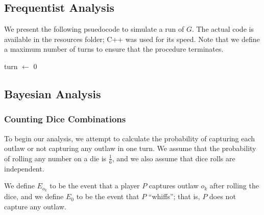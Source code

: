 \documentclass{article}
\theoremstyle{definition}
\theoremstyle{plain}
\begin{document}
	\subsection{Frequentist Analysis}
	We present the following psuedocode to simulate a run of $G$. The actual code is available in the resources folder; C++ was used for its speed. Note that we define a maximum number of turns to ensure that the procedure terminates.
	\begin{algorithm}

	turn $\gets$ 0\\
	\end{algorithm}

	\subsection{Bayesian Analysis}

	\subsubsection{Counting Dice Combinations}
	To begin our analysis, we attempt to calculate the probability of capturing each outlaw or not capturing any outlaw in one turn. We assume that the probability of rolling any number on a die is $\frac{1}{6}$, and we also assume that dice rolls are independent.

	We define $E_{o_k}$ to be the event that a player $P$ captures outlaw $o_k$ after rolling the dice, and we define $E_0$ to be the event that $P$ ``whiffs''; that is, $P$ does not capture any outlaw. 
\end{document}
